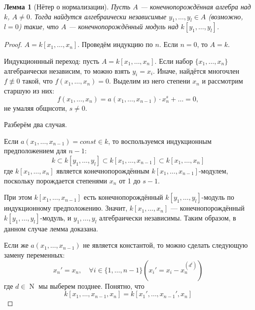 \documentclass{article}
\newtheorem*{lemma}{Лемма}
\theoremstyle{definition}
\theoremstyle{remark}
\DeclareMathOperator{\N}{N}
\begin{document}
\begin{lemma}[Нётер о нормализации]
    Пусть $A$ --- конечнопорождённая алгебра над $k$, $A \neq 0$. Тогда найдутся алгебраически независимые $y_1, \hdots, y_l \in A$ (возможно, $l = 0$) такие, что $A$ --- конечнопорождённый модуль над $k[y_1, \hdots, y_l]$.
\end{lemma}
\begin{proof}
    $A = k[x_1, \hdots, x_n]$. Проведём индукцию по $n$. Если $n = 0$, то $A = k$.

    Индукционнный переход: пусть $A = k[x_1, \hdots, x_n]$. Если набор $\{x_1, \hdots, x_n\}$ алгебраически независим, то можно взять $y_i = x_i$. Иначе, найдётся многочлен $f \not\equiv 0$ такой, что $f(x_1, \hdots, x_n) = 0$. Выделим из него степени $x_n$ и рассмотрим старшую из них:
    \begin{equation*}
        f(x_1, \hdots, x_n) = a(x_1, \hdots, x_{n-1}) \cdot x_n^s + \hdots = 0,
    \end{equation*}
    не умаляя общнсоти, $s \neq 0$. 
    
    Разберём два случая.

    Если $a(x_1, \hdots, x_{n-1}) = const \in k$, то воспользуемся индукционным предположением для $n-1$:
    \begin{equation*}
        k \subset k[y_1, \hdots, y_l] \subset k[x_1, \hdots, x_{n-1}] \subset k[x_1, \hdots, x_n]
    \end{equation*}
    где $k[x_1, \hdots, x_n]$ является конечнопорождённым $k[x_1, \hdots, x_{n-1}]$-модулем, поскольку порождается степенями $x_n$ от 1 до $s-1$.
    
    При этом $k[x_1, \hdots, x_{n-1}]$ есть конечнопорождённый $k[y_1, \hdots, y_l]$-модуль по индукционному предположению. Значит, $k[x_1, \hdots, x_n]$ --- конечнопорождённый $k[y_1, \hdots, y_l]$-модуль, и $y_1, \hdots, y_l$ алгебраически независимы. Таким образом, в данном случае лемма доказана.

    Если же $a(x_1, \hdots, x_{n-1})$ не является константой, то можно сделать следующую замену переменных:
    \begin{equation*}
        x_n' = x_n, \quad \forall i \in \{ 1, \hdots, n-1 \} \left( x_i' = x_i - x_n^{(d^i)} \right)
    \end{equation*}
    где $d \in \N$ мы выберем позднее. Понятно, что $$k[x_1, \hdots, x_{n-1}, x_n] = k[x_1', \hdots, x_{n-1}', x_n]$$


\end{proof}
\end{document}
